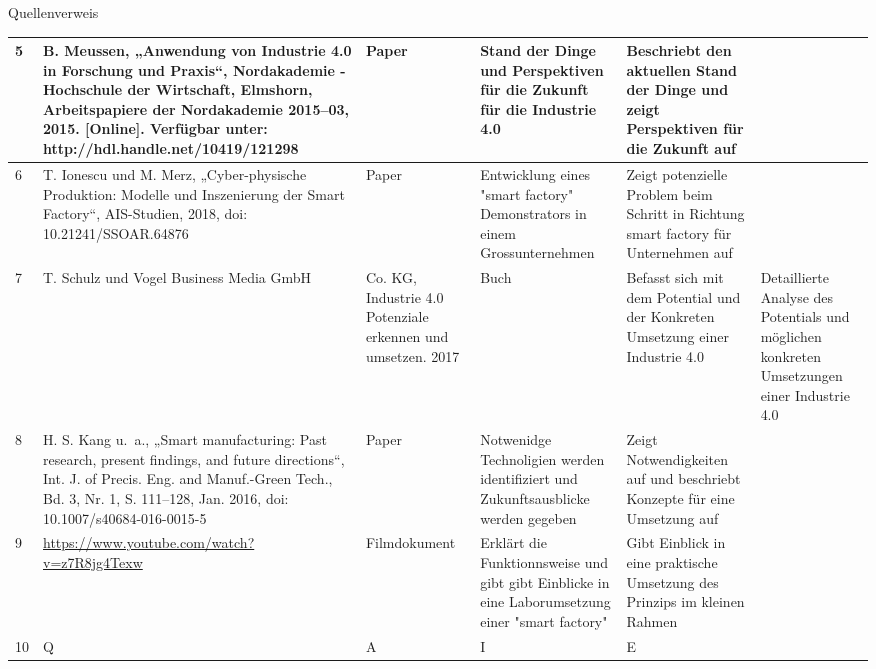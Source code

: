\documentclass{article}
\begin{document}
\begin{Map}{Quellenverweis}
{\begin{tabular}{p{0.2cm}p{4.2cm}p{2cm}p{3.2cm}p{3.2cm}}
 5& 
 B. Meussen, „Anwendung von Industrie 4.0 in Forschung und Praxis“, Nordakademie - Hochschule der Wirtschaft, Elmshorn, Arbeitspapiere der Nordakademie 2015–03,  2015. [Online]. Verfügbar unter: http://hdl.handle.net/10419/121298 & 
 Paper & 
 Stand der Dinge und Perspektiven für die Zukunft für die Industrie 4.0 & 
 Beschriebt den aktuellen Stand der Dinge und zeigt Perspektiven für die Zukunft auf\\\midrule
 
 6& 
 T. Ionescu und M. Merz, „Cyber-physische Produktion: Modelle und Inszenierung der Smart Factory“, AIS-Studien, 2018, doi: 10.21241/SSOAR.64876 &
 Paper & 
 Entwicklung eines "smart factory" Demonstrators in einem Grossunternehmen & 
 Zeigt potenzielle Problem beim Schritt in Richtung smart factory für Unternehmen auf\\\midrule
 
 7& 
 T. Schulz und Vogel Business Media GmbH & Co. KG, Industrie 4.0 Potenziale erkennen und umsetzen. 2017 &
 Buch & 
 Befasst sich mit dem Potential und der Konkreten Umsetzung einer Industrie 4.0 & 
 Detaillierte Analyse des Potentials und möglichen konkreten Umsetzungen einer Industrie 4.0\\\midrule
 
 8& 
 H. S. Kang u. a., „Smart manufacturing: Past research, present findings, and future directions“, Int. J. of Precis. Eng. and Manuf.-Green Tech., Bd. 3, Nr. 1, S. 111–128, Jan. 2016, doi: 10.1007/s40684-016-0015-5 & 
 Paper & 
 Notwenidge Technoligien werden identifiziert und Zukunftsausblicke werden gegeben & 
 Zeigt Notwendigkeiten auf und beschriebt Konzepte für eine Umsetzung auf\\\midrule
 
 9& 
 \url{https://www.youtube.com/watch?v=z7R8jg4Texw} &
 Filmdokument & 
 Erklärt die Funktionnsweise und gibt gibt Einblicke in eine Laborumsetzung einer "smart factory" & 
 Gibt Einblick in eine praktische Umsetzung des Prinzips im kleinen Rahmen\\\midrule
 
10& Q & A & I & E\\\bottomrule

\end{tabular}}

\begingroup
\renewcommand{\section}[2]{}%


\endgroup
\end{Map}
\end{document}
